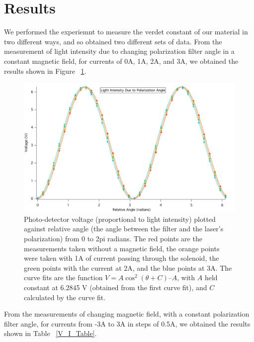 \documentclass[prb,preprint]{revtex4-1}
\begin{document}
\section{Results}

We performed the experiemnt to measure the verdet constant of our material in two different ways, and so obtained two different sets of data.  From the measurement of light intensity due to changing polarization filter angle in a constant magnetic field, for currents of 0A, 1A, 2A, and 3A, we obtained the results shown in Figure ~\ref{V_ThetaRel_Plot}. 

\begin{figure}[h!]
\centering
\includegraphics[width=6in]{V_ThetaRel_Plot.pdf}
\caption{Photo-detector voltage (proportional to light intensity) plotted against relative angle (the angle between the filter and the laser’s polarization) from 0 to 2pi radians.  The red points are the measurements taken without a magnetic field, the orange points were taken with 1A of current passing through the solenoid, the green points with the current at 2A, and the blue points at 3A.  The curve fits are the function $V = A \cos^{2}(\theta + C) – A$, with $A$ held constant at 6.2845 V (obtained from the first curve fit), and $C$ calculated by the curve fit. }
\label{V_ThetaRel_Plot}
\end{figure}

From the measurements of changing magnetic field, with a constant polarization filter angle, for currents from -3A to 3A in steps of 0.5A, we obtained the results shown in Table ~\ref{V_I_Table}. 
\end{document}
